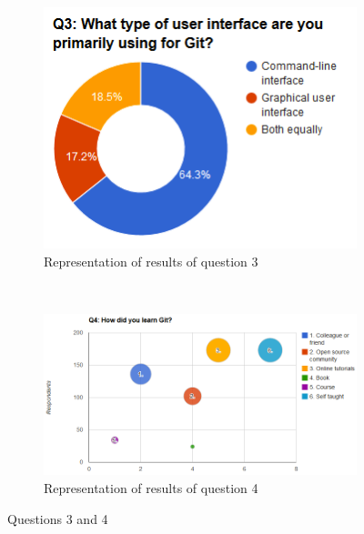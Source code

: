 \documentclass[a4paper,oneside]{bth} %
\begin{document}
		\begin{figure}[H]
			\centering
			\begin{subfigure}[b]{0.45\textwidth}
				\includegraphics[width=\textwidth]{graphs/q3.png}
				\caption{Representation of results of question 3}
				\label{fig:q3}
			\end{subfigure}
			~
			\begin{subfigure}[b]{0.45\textwidth}
				\includegraphics[width=\textwidth]{graphs/q4.png}
				\caption{Representation of results of question 4}
				\label{fig:q4}
			\end{subfigure}
			\caption{Questions 3 and 4}\label{fig:q3-q4}
		\end{figure}
\end{document}
